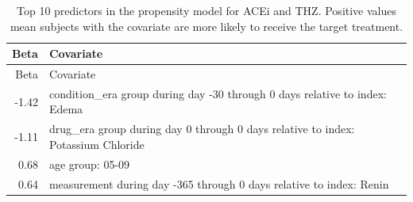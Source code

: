 \documentclass[11pt]{book}
\begin{document}
\begin{longtable}[]{@{}rl@{}}
\caption{\label{tab:psModel} Top 10 predictors in the propensity model for
ACEi and THZ. Positive values mean subjects with the covariate are more
likely to receive the target treatment.}\tabularnewline
\toprule
\begin{minipage}[b]{0.07\columnwidth}\raggedleft\strut
Beta\strut
\end{minipage} & \begin{minipage}[b]{0.87\columnwidth}\raggedright\strut
Covariate\strut
\end{minipage}\tabularnewline
\midrule
\endfirsthead
\toprule
\begin{minipage}[b]{0.07\columnwidth}\raggedleft\strut
Beta\strut
\end{minipage} & \begin{minipage}[b]{0.87\columnwidth}\raggedright\strut
Covariate\strut
\end{minipage}\tabularnewline
\midrule
\endhead
\begin{minipage}[t]{0.07\columnwidth}\raggedleft\strut
-1.42\strut
\end{minipage} & \begin{minipage}[t]{0.87\columnwidth}\raggedright\strut
condition\_era group during day -30 through 0 days relative to index:
Edema\strut
\end{minipage}\tabularnewline
\begin{minipage}[t]{0.07\columnwidth}\raggedleft\strut
-1.11\strut
\end{minipage} & \begin{minipage}[t]{0.87\columnwidth}\raggedright\strut
drug\_era group during day 0 through 0 days relative to index: Potassium
Chloride\strut
\end{minipage}\tabularnewline
\begin{minipage}[t]{0.07\columnwidth}\raggedleft\strut
0.68\strut
\end{minipage} & \begin{minipage}[t]{0.87\columnwidth}\raggedright\strut
age group: 05-09\strut
\end{minipage}\tabularnewline
\begin{minipage}[t]{0.07\columnwidth}\raggedleft\strut
0.64\strut
\end{minipage} & \begin{minipage}[t]{0.87\columnwidth}\raggedright\strut
measurement during day -365 through 0 days relative to index:
Renin\strut
\end{minipage}\tabularnewline

\end{longtable}
\end{document}
